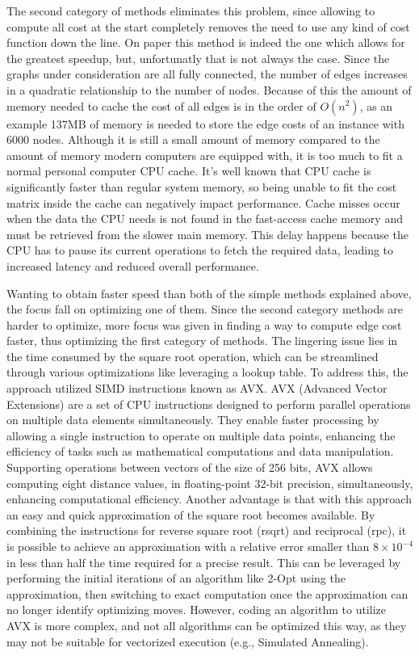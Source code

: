 The second category of methods eliminates this problem, since allowing to compute all cost at the start completely removes the need to use any kind of cost function down the line.
On paper this method is indeed the one which allows for the greatest speedup, but, unfortunatly that is not always the case.
Since the graphs under consideration are all fully connected, the number of edges increases in a quadratic relationship to the number of nodes.
Because of this the amount of memory needed to cache the cost of all edges is in the order of $O(n^2)$, as an example 137MB of memory is needed to store the edge costs of an instance with 6000 nodes.
Although it is still a small amount of memory compared to the amount of memory modern computers are equipped with, it is too much to fit a normal personal computer CPU cache.
It's well known that CPU cache is significantly faster than regular system memory, so being unable to fit the cost matrix inside the cache can negatively impact performance.
Cache misses occur when the data the CPU needs is not found in the fast-access cache memory and must be retrieved from the slower main memory.
This delay happens because the CPU has to pause its current operations to fetch the required data, leading to increased latency and reduced overall performance.

Wanting to obtain faster speed than both of the simple methods explained above, the focus fall on optimizing one of them.
Since the second category methods are harder to optimize, more focus was given in finding a way to compute edge cost faster, thus optimizing the first category of methods.
The lingering issue lies in the time consumed by the square root operation, which can be streamlined through various optimizations like leveraging a lookup table.
To address this, the approach utilized SIMD instructions known as AVX.
AVX (Advanced Vector Extensions) are a set of CPU instructions designed to perform parallel operations on multiple data elements simultaneously.
They enable faster processing by allowing a single instruction to operate on multiple data points, enhancing the efficiency of tasks such as mathematical computations and data manipulation.
Supporting operations between vectors of the size of 256 bits, AVX allows computing eight distance values, in floating-point 32-bit precision, simultaneously, enhancing computational efficiency.
Another advantage is that with this approach an easy and quick approximation of the square root becomes available.
By combining the instructions for reverse square root (rsqrt) and reciprocal (rpc), it is possible to achieve an approximation with a relative error smaller than $8 \times 10^{-4}$ in less than half the time required for a precise result.
This can be leveraged by performing the initial iterations of an algorithm like 2-Opt using the approximation, then switching to exact computation once the approximation can no longer identify optimizing moves.
However, coding an algorithm to utilize AVX is more complex, and not all algorithms can be optimized this way, as they may not be suitable for vectorized execution (e.g., Simulated Annealing).

